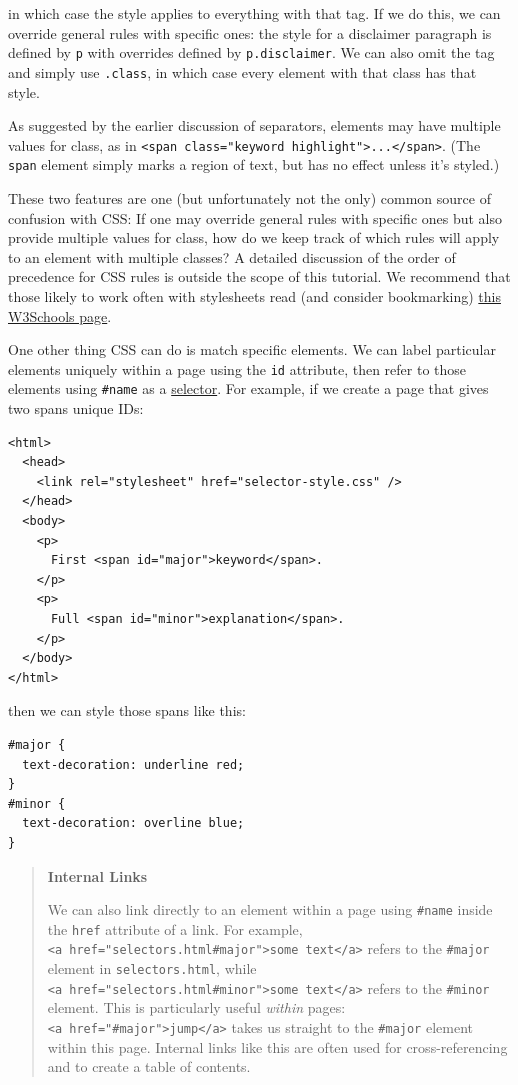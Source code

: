 in which case the style applies to everything with that tag. If we do
this, we can override general rules with specific ones: the style for a
disclaimer paragraph is defined by \texttt{p} with overrides defined by
\texttt{p.disclaimer}. We can also omit the tag and simply use
\texttt{.class}, in which case every element with that class has that
style.

As suggested by the earlier discussion of separators, elements may have
multiple values for class, as in
\texttt{\textless{}span\ class="keyword\ highlight"\textgreater{}...\textless{}/span\textgreater{}}.
(The \texttt{span} element simply marks a region of text, but has no
effect unless it's styled.)

These two features are one (but unfortunately not the only) common
source of confusion with CSS: If one may override general rules with
specific ones but also provide multiple values for class, how do we keep
track of which rules will apply to an element with multiple classes? A
detailed discussion of the order of precedence for CSS rules is outside
the scope of this tutorial. We recommend that those likely to work often
with stylesheets read (and consider bookmarking)
\href{https://www.w3schools.com/css/css_specificity.asp}{this W3Schools
page}.

One other thing CSS can do is match specific elements. We can label
particular elements uniquely within a page using the \texttt{id}
attribute, then refer to those elements using \texttt{\#name} as a
\protect\hyperlink{g:selector}{selector}. For example, if we create a
page that gives two spans unique IDs:

\begin{verbatim}
<html>
  <head>
    <link rel="stylesheet" href="selector-style.css" />
  </head>
  <body>
    <p>
      First <span id="major">keyword</span>.
    </p>
    <p>
      Full <span id="minor">explanation</span>.
    </p>
  </body>
</html>
\end{verbatim}

then we can style those spans like this:

\begin{verbatim}
#major {
  text-decoration: underline red;
}
#minor {
  text-decoration: overline blue;
}
\end{verbatim}

\begin{quote}
\textbf{Internal Links}

We can also link directly to an element within a page using
\texttt{\#name} inside the \texttt{href} attribute of a link. For
example,
\texttt{\textless{}a\ href="selectors.html\#major"\textgreater{}some\ text\textless{}/a\textgreater{}}
refers to the \texttt{\#major} element in \texttt{selectors.html}, while
\texttt{\textless{}a\ href="selectors.html\#minor"\textgreater{}some\ text\textless{}/a\textgreater{}}
refers to the \texttt{\#minor} element. This is particularly useful
\emph{within} pages:
\texttt{\textless{}a\ href="\#major"\textgreater{}jump\textless{}/a\textgreater{}}
takes us straight to the \texttt{\#major} element within this page.
Internal links like this are often used for cross-referencing and to
create a table of contents.
\end{quote}

